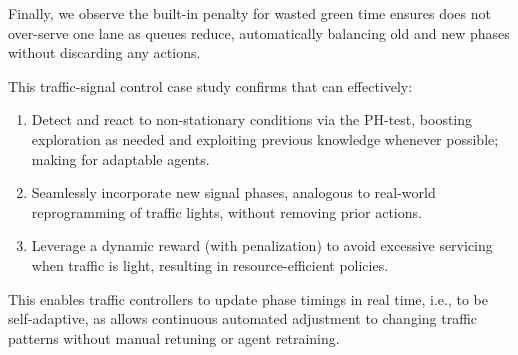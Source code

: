 Finally, we observe the built-in penalty for wasted green time ensures \adaptiverl does not over-serve 
one lane as queues reduce, automatically balancing old and new phases without discarding any 
actions.

This traffic-signal control case study confirms that \adaptiverl can effectively:
\begin{enumerate}
  \item Detect and react to non-stationary conditions via the PH-test, boosting exploration as needed 
  and exploiting previous knowledge whenever possible; making for adaptable agents.
  \item Seamlessly incorporate new signal phases, analogous to real-world reprogramming of traffic 
  lights, without removing prior actions.
  \item Leverage a dynamic reward (with penalization) to avoid excessive servicing when traffic is light, 
  resulting in resource-efficient policies.
\end{enumerate}

This enables traffic controllers to update phase timings in real time, i.e., to be self-adaptive, 
 as \adaptiverl allows continuous automated adjustment to changing 
traffic patterns without manual retuning or agent retraining.


\endinput

